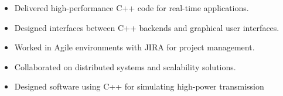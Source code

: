 \documentclass[10pt,a4paper,ragged2e,withhyper]{altacv}
\begin{document}
\begin{paracol}{2}
	\divider

	\begin{itemize}
		\item Delivered high-performance C++ code for real-time applications.
		\item Designed interfaces between C++ backends and graphical user interfaces.
		\item Worked in Agile environments with JIRA for project management.
		\item Collaborated on distributed systems and scalability solutions.
		\item Designed software using C++ for simulating high-power transmission
	\end{itemize}




	\switchcolumn



	{\LaTeXraggedright
		\par}

	\divider\smallskip


\end{paracol}
\end{document}
